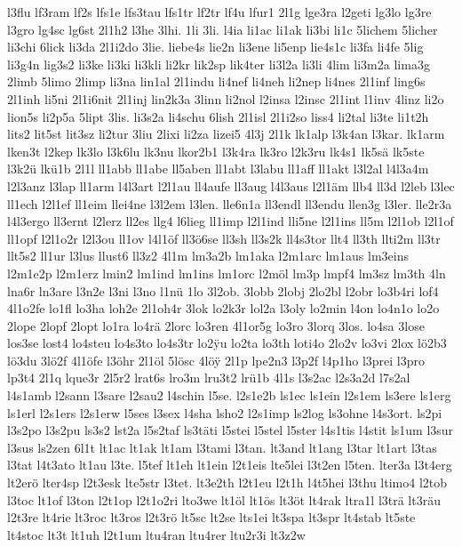 {l3flu
lf3ram
lf2s
lfs1e
lfs3tau
lfs1tr
lf2tr
lf4u
lfur1
2l1g
lge3ra
l2geti
lg3lo
lg3re
l3gro
lg4sc
lg6st
2l1h2
l3he
3lhi.
1li
3li.
l4ia
li1ac
li1ak
li3bi
li1c
5lichem
5licher
li3chi
6lick
li3da
2l1i2do
3lie.
liebe4s
lie2n
li3ene
li5enp
lie4s1c
li3fa
li4fe
5lig
li3g4n
lig3s2
li3ke
li3ki
li3kli
li2kr
lik2sp
lik4ter
li3l2a
li3li
4lim
li3m2a
lima3g
2limb
5limo
2limp
li3na
lin1al
2l1indu
li4nef
li4neh
li2nep
li4nes
2l1inf
ling6s
2l1inh
li5ni
2l1i6nit
2l1inj
lin2k3a
3linn
li2nol
l2insa
l2insc
2l1int
l1inv
4linz
li2o
lion5s
li2p5a
5lipt
3lis.
li3s2a
li4schu
6lish
2l1isl
2l1i2so
liss4
li2tal
li3te
li1t2h
lits2
lit5st
lit3sz
li2tur
3liu
2lixi
li2za
lizei5
4l3j
2l1k
lk1alp
l3k4an
l3kar.
lk1arm
lken3t
l2kep
lk3lo
l3k6lu
lk3nu
lkor2b1
l3k4ra
lk3ro
l2k3ru
lk4s1
lk5sä
lk5ste
l3k2ü
lkü1b
2l1l
ll1abb
ll1abe
ll5aben
ll1abt
l3labu
ll1aff
ll1akt
l3l2al
l4l3a4m
l2l3anz
l3lap
ll1arm
l4l3art
l2l1au
ll4aufe
ll3aug
l4l3aus
l2l1äm
llb4
ll3d
l2leb
l3lec
ll1ech
l2l1ef
ll1eim
llei4ne
l3l2em
l3len.
lle6n1a
ll3endl
ll3endu
llen3g
l3ler.
lle2r3a
l4l3ergo
ll3ernt
l2lerz
ll2es
llg4
l6lieg
ll1imp
l2l1ind
lli5ne
l2l1ins
ll5m
l2l1ob
l2l1of
ll1opf
l2l1o2r
l2l3ou
ll1ov
l4l1öf
ll3ö6se
ll3sh
ll3s2k
ll4s3tor
llt4
ll3th
llti2m
ll3tr
llt5s2
ll1ur
l3lus
llust6
ll3z2
4l1m
lm3a2b
lm1aka
l2m1arc
lm1aus
lm3eins
l2m1e2p
l2m1erz
lmin2
lm1ind
lm1ins
lm1orc
l2möl
lm3p
lmpf4
lm3sz
lm3th
4ln
lna6r
ln3are
l3n2e
l3ni
l3no
l1nü
1lo
3l2ob.
3lobb
2lobj
2lo2bl
l2obr
lo3b4ri
lof4
4l1o2fe
lo1fl
lo3ha
loh2e
2l1oh4r
3lok
lo2k3r
lol2a
l3oly
lo2min
l4on
lo4n1o
lo2o
2lope
2lopf
2lopt
lo1ra
lo4rä
2lorc
lo3ren
4l1or5g
lo3ro
3lorq
3los.
lo4sa
3lose
los3se
lost4
lo4steu
lo4s3to
lo4s3tr
lo2^^ffu
lo2ta
lo3th
loti4o
2lo2v
lo3vi
2lox
lö2b3
lö3du
3lö2f
4l1öfe
l3öhr
2l1öl
5lösc
4lö^^ff
2l1p
lpe2n3
l3p2f
l4p1ho
l3prei
l3pro
lp3t4
2l1q
lque3r
2l5r2
lrat6s
lro3m
lru3t2
lrü1b
4l1s
l3s2ac
l2s3a2d
l7s2al
l4s1amb
l2sann
l3sare
l2sau2
l4schin
l5se.
l2s1e2b
ls1ec
ls1ein
l2s1em
ls3ere
ls1erg
ls1erl
l2s1ers
l2s1erw
l5ses
l3sex
l4sha
lsho2
l2s1imp
ls2log
ls3ohne
l4s3ort.
ls2pi
l3s2po
l3s2pu
ls3s2
lst2a
l5s2taf
ls3täti
l5stei
l5stel
l5ster
l4s1tis
l4stit
ls1um
l3sur
l3sus
ls2zen
6l1t
lt1ac
lt1ak
lt1am
l3tami
l3tan.
lt3and
lt1ang
l3tar
lt1art
l3tas
l3tat
l4t3ato
lt1au
l3te.
l5tef
lt1eh
lt1ein
l2t1eis
lte5lei
l3t2en
l5ten.
lter3a
l3t4erg
lt2erö
lter4sp
l2t3esk
lte5str
l3tet.
lt3e2th
l2t1eu
l2t1h
l4t5hei
l3thu
ltimo4
l2tob
l3toc
lt1of
l3ton
l2t1op
l2t1o2ri
lto3we
lt1öl
lt1ös
lt3öt
lt4rak
ltra1l
l3trä
lt3räu
l2t3re
lt4rie
lt3roc
lt3ros
l2t3rö
lt5sc
lt2se
lts1ei
lt3spa
lt3spr
lt4stab
lt5ste
lt4stoc
lt3t
lt1uh
l2t1um
ltu4ran
ltu4rer
ltu2r3i
lt3z2w
}
